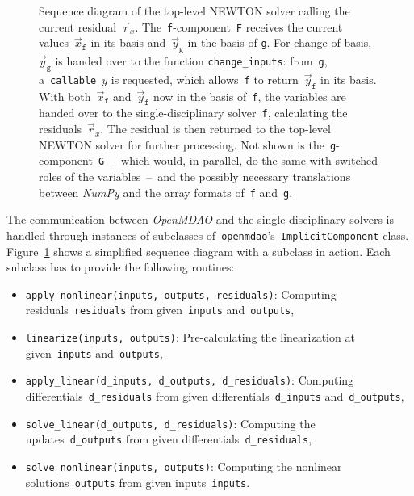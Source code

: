 \documentclass[10pt, ngerman, english,
twoside, open=right,
numbers=noenddot,
declaration=section,
abstract=section,
abstract=multiple,
abstract=notoc,
declaration=notoc,
cd=pale, 
chapterprefix=off, 
chapterpage=false, 
headingsvskip=-10em,
cdgeometry=custom, 
slantedgreek=on,
cdmath=on, 
cdfont=on,
ttfont=false,
mathswap=off,
]{tudscrreprt}
\numberwithin{equation}{chapter}
\renewcommand{\textsc}[1]{\uppercase{\mbox{#1}}}
\newcommand{\sidenote}[1]{
  \leavevmode %
  \marginpar{\hyphenpenalty=1000 \flushleft{\textcolor{HKS41}{#1}}}}
\begin{document}
\begin{figure}[t!]
\centering

\caption{Sequence diagram of the top-level \textsc{Newton} solver calling the current residual~$\vec{r}_x$. The~\texttt{f}-component~\texttt{F} receives the current values~$\vec{x}_\texttt{f}$ in its basis and~$\vec{y}_\texttt{g}$ in the basis of \texttt{g}. For change of basis,~$\vec{y}_\texttt{g}$ is handed over to the function \texttt{change\_inputs}: from~\texttt{g}, a~\texttt{callable}~$y$ is requested, which allows~\texttt{f} to return~$\vec{y}_\texttt{f}$ in its basis. With both~$\vec{x}_\texttt{f}$ and~$\vec{y}_\texttt{f}$ now in the basis of~\texttt{f}, the variables are handed over to the single-disciplinary solver~\texttt{f}, calculating the residuals~$\vec{r}_x$. The residual is then returned to the top-level \textsc{Newton} solver for further processing. Not shown is the~\texttt{g}-component~\texttt{G}~--~which would, in parallel, do the same with switched roles of the variables~--~and the possibly necessary translations between \textit{NumPy} and the array formats of~\texttt{f} and~\texttt{g}.}\label{fig:Coup_sequence}
\end{figure}
\sidenote{\texttt{ImplicitComponent}}The communication between \textit{OpenMDAO} and the single-disciplinary solvers is handled through instances of subclasses of~\texttt{openmdao}'s~\texttt{ImplicitComponent} class. Figure~\ref{fig:Coup_sequence} shows a simplified sequence diagram with a subclass in action. Each subclass has to provide the following routines:
\begin{itemize}
\item \texttt{apply\_nonlinear(inputs, outputs, residuals)}: Computing residuals~\texttt{residuals} from given~\texttt{inputs} and~\texttt{outputs},
\item \texttt{linearize(inputs, outputs)}: Pre-calculating the linearization at given~\texttt{inputs} and~\texttt{outputs},
\item \texttt{apply\_linear(d\_inputs, d\_outputs, d\_residuals)}: Computing differentials~\texttt{d\_residuals} from given differentials~\texttt{d\_inputs} and~\texttt{d\_outputs},
\item \texttt{solve\_linear(d\_outputs, d\_residuals)}: Computing the updates~\texttt{d\_outputs} from given differentials~\texttt{d\_residuals},
\item \texttt{solve\_nonlinear(inputs, outputs)}: Computing the nonlinear solutions~\texttt{outputs} from given inputs~\texttt{inputs}.
\end{itemize}
\end{document}
